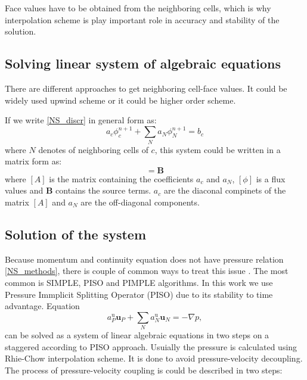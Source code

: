 Face values have to be obtained from the neighboring cells, which is why interpolation scheme is play important role in accuracy and stability of the solution.

\subsection{Solving linear system of algebraic equations}
There are different approaches to get neighboring cell-face values. It could be widely used upwind scheme or it could be higher order scheme.

If we write \ref{NS_discr} in general form as:
\begin{equation}
a_{c} \phi_{c}^{n+1}+\sum_{N} a_{N} \phi_{N}^{n+1}=b_{c}
\end{equation}
where $N$ denotes of neighboring cells of $c$, this system could be written in a matrix form as:
\begin{equation}
[A][\phi]=\mathbf{B}
\end{equation}
where $[A]$ is the matrix containing the coefficients $a_c$ and $a_N$, $[\phi]$ is a flux values and $\mathbf{B}$ contains the source terms. $a_c$ are the diaconal compinets of the matrix $[A]$ and $a_N$ are the off-diagonal components. 

\subsection{Solution of the system}\label{p-v-coupling}
Because momentum and continuity equation does not have pressure relation \ref{NS_methods}, there is couple of common ways to treat this issue \cite{ferziger2002cfd}. The most common is SIMPLE, PISO and PIMPLE algorithms. In this work we use Pressure Immplicit Splitting Operator (PISO) \cite{ferziger2002cfd} due to its stability to time advantage. Equation
\begin{equation}\label{NS_algebraic}
    a_{P}^{\mathrm{u}} \mathbf{u}_{P}+\sum_{N} a_{N}^{\mathrm{u}} \mathbf{u}_{N}= -\nabla p,
\end{equation}
can be solved as a system of linear algebraic equations in two steps on a staggered according to PISO approach. Usuially the pressure is calculated using Rhie-Chow\cite{rhie} interpolation scheme. It is done to avoid pressure-velocity decoupling. The process of pressure-velocity coupling is could be described in two steps:

